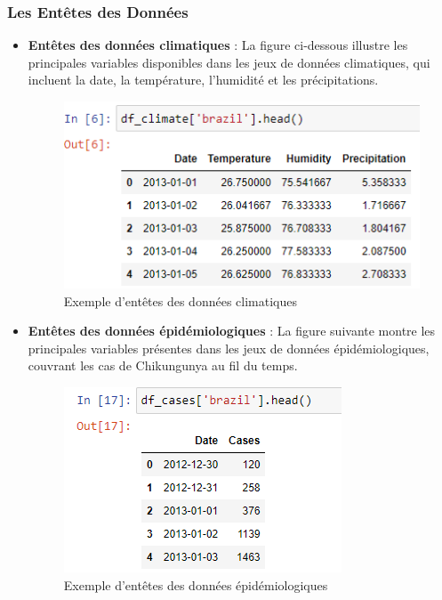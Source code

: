 \subsubsection*{Les Entêtes des Données}
\begin{itemize}
	\item \textbf{Entêtes des données climatiques} : La figure ci-dessous illustre les principales variables disponibles dans les jeux de données climatiques, qui incluent la date, la température, l'humidité et les précipitations.
	\begin{figure}[h!]
		\centering
		\includegraphics[width=0.7\linewidth]{images/climate_dataset_sample}
		\caption[Exemple d'entêtes des données climatiques]{Exemple d'entêtes des données climatiques}
		\label{fig:climatedatasetsample}
	\end{figure}
	
	\item \textbf{Entêtes des données épidémiologiques} : La figure suivante montre les principales variables présentes dans les jeux de données épidémiologiques, couvrant les cas de Chikungunya au fil du temps.
	\begin{figure}[h!]
		\centering
		\includegraphics[width=0.5\linewidth]{images/cases_dataset_sample}
		\caption[Exemple d'entêtes des données épidémiologiques]{Exemple d'entêtes des données épidémiologiques}
		\label{fig:casesdatasetsample}
	\end{figure}
\end{itemize}


